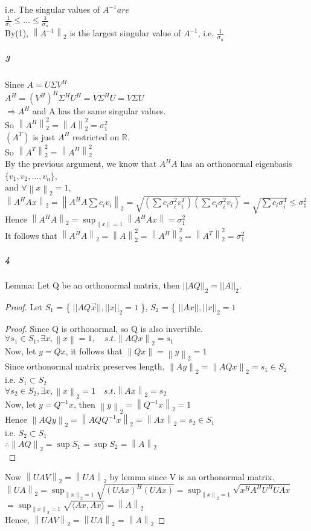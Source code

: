 \documentclass[10pt,letter]{article}
\newcommand\norm[1]{\left\lVert#1\right\rVert}
\begin{document}
i.e. The singular values of $A^{-1} are$ \\
$\frac{1}{\sigma_1}\leq\dots\leq\frac{1}{\sigma_n}$\\
By(1), $\norm{A^{-1}}_2$ is the largest singular value of $A^{-1}$, i.e. $\frac{1}{\sigma_n}$
\subparagraph{3}
Since $A=U\Sigma V^H$\\
$A^H=(V^H)^H\Sigma^HU^H=V\Sigma^HU=V\Sigma U$\\
$\Rightarrow A^H$ and A has the same singular values. \\
So $\norm{A^H}_2^2=\norm{A}_2^2=\sigma_1^2$\\
$(A^T)$ is just $A^H$ restricted on $\mathbb{R}$.\\
So $\norm{A^T}_2^2=\norm{A^H}_2^2$\\
By the previous argument, we know that $A^HA$ has an orthonormal eigenbasis $\{v_1, v_2, \dots,v_n \}$, \\
and $\forall \norm{x}_2=1$,   $\norm{A^HAx}_2=\norm{A^HA\sum c_iv_i}_2=\sqrt{(\sum c_i\sigma_i^2 v_i^T)(\sum c_i\sigma_i^2 v_i)}=\sqrt{\sum c_i\sigma_i^4}\leq \sigma_1^2$ \\
Hence $\norm{A^HA}_2=\sup_{\norm{x}=1}\norm{A^HAx}=\sigma_1^2$\\
It follows that $\norm{A^HA}_2=\norm{A}_2^2=\norm{A^H}_2^2=\norm{A^T}_2^2=\sigma_1^2$
\subparagraph{4}
Lemma: Let Q be an orthonormal matrix, then $||AQ||_{2} =  ||A||_{2}$.
\begin{proof}
	Let $S_{1}$ = \{ $||AQ\vec{x}||, ||x||_{2} = 1$ \},
	$S_{2}$  = \{ $||Ax||, ||x||_{2} = 1$ 
	\begin{proof}
		Since Q is orthonormal, so Q is also invertible.\\
		$\forall s_{1} \in S_{1}, \exists x, \norm{x}=1, \quad s.t. \norm{AQx}_2=s_1$\\
		Now, let $y=Qx$, it follows that $\norm{Qx}=\norm{y}_2=1$\\
		Since orthonormal matrix preserves length, $\norm{Ay}_2=\norm{AQx}_2=s_1\in S_2$\\
		i.e. $S_1\subset S_2$\\
		$\forall s_2\in S_2, \exists x, \norm{x}_2=1 \quad s.t. \norm{Ax}_2=s_2$\\
		Now, let $y=Q^{-1}x$, then $\norm{y}_2=\norm{Q^{-1}x}_2=1$\\
		Hence $\norm{AQy}_2=\norm{AQQ^{-1}x}_2=\norm{Ax}_2=s_2\in S_1$\\
		i.e. $S_2\subset S_1$\\
		$\therefore \norm{AQ}_2=\sup S_1=\sup S_2=\norm{A}_2$\\
	\end{proof}
Now $\norm{UAV}_2=\norm{UA}_2$ by lemma since V is an orthonormal matrix.\\
$\norm{UA}_2=\sup_{\norm{x}_2=1}\sqrt{(UAx)^H(UAx)}=\sup_{\norm{x}_2=1}\sqrt{x^HA^HU^HUAx}$\\
$=\sup_{\norm{x}_2=1}\sqrt{\langle Ax, Ax \rangle}=\norm{A}_2$\\
Hence, $\norm{UAV}_2=\norm{UA}_2=\norm{A}_2$
\end{proof}
\end{document}
